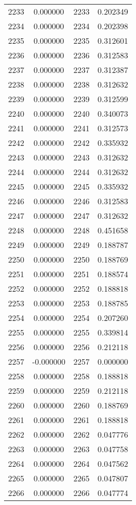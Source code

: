 \documentclass[12pt]{article}
\begin{document}
\begin{longtable}{@{}cccc@{}}
2233 & 0.000000 & 2233 & 0.202349 \\
2234 & 0.000000 & 2234 & 0.202398 \\
2235 & 0.000000 & 2235 & 0.312601 \\
2236 & 0.000000 & 2236 & 0.312583 \\
2237 & 0.000000 & 2237 & 0.312387 \\
2238 & 0.000000 & 2238 & 0.312632 \\
2239 & 0.000000 & 2239 & 0.312599 \\
2240 & 0.000000 & 2240 & 0.340073 \\
2241 & 0.000000 & 2241 & 0.312573 \\
2242 & 0.000000 & 2242 & 0.335932 \\
2243 & 0.000000 & 2243 & 0.312632 \\
2244 & 0.000000 & 2244 & 0.312632 \\
2245 & 0.000000 & 2245 & 0.335932 \\
2246 & 0.000000 & 2246 & 0.312583 \\
2247 & 0.000000 & 2247 & 0.312632 \\
2248 & 0.000000 & 2248 & 0.451658 \\
2249 & 0.000000 & 2249 & 0.188787 \\
2250 & 0.000000 & 2250 & 0.188769 \\
2251 & 0.000000 & 2251 & 0.188574 \\
2252 & 0.000000 & 2252 & 0.188818 \\
2253 & 0.000000 & 2253 & 0.188785 \\
2254 & 0.000000 & 2254 & 0.207260 \\
2255 & 0.000000 & 2255 & 0.339814 \\
2256 & 0.000000 & 2256 & 0.212118 \\
2257 & -0.000000 & 2257 & 0.000000 \\
2258 & 0.000000 & 2258 & 0.188818 \\
2259 & 0.000000 & 2259 & 0.212118 \\
2260 & 0.000000 & 2260 & 0.188769 \\
2261 & 0.000000 & 2261 & 0.188818 \\
2262 & 0.000000 & 2262 & 0.047776 \\
2263 & 0.000000 & 2263 & 0.047758 \\
2264 & 0.000000 & 2264 & 0.047562 \\
2265 & 0.000000 & 2265 & 0.047807 \\
2266 & 0.000000 & 2266 & 0.047774 \\

\end{longtable}
\end{document}
